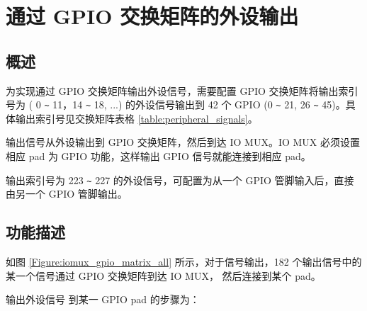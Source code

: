 \documentclass[main\_\_CN.tex]{subfiles}
\begin{document}
\section{通过 GPIO 交换矩阵的外设输出}

\subsection{概述}

为实现通过 GPIO 交换矩阵输出外设信号，需要配置 GPIO 交换矩阵将输出索引号为 ( 0 \verb+~+ 11，14 \verb+~+ 18, ...) 的外设信号输出到 42 个 GPIO (0 \verb+~+ 21, 26 \verb+~+ 45)。具体输出索引号见交换矩阵表格 \ref{table:peripheral_signals}。

输出信号从外设输出到 GPIO 交换矩阵，然后到达 IO MUX。IO MUX 必须设置相应 pad 为 GPIO 功能，这样输出 GPIO 信号就能连接到相应 pad。


\begin{tiplisting}
输出索引号为 223 \verb+~+ 227 的外设信号，可配置为从一个 GPIO 管脚输入后，直接由另一个 GPIO 管脚输出。
\end{tiplisting}
\vspace{-2em}
\subsection{功能描述}\label{IOMUXPeripheralOutput}

如图 \ref{Figure:iomux_gpio_matrix_all} 所示，对于信号输出，182 个输出信号中的某一个信号通过 GPIO 交换矩阵到达 IO MUX， 然后连接到某个 pad。

输出外设信号  到某一 GPIO pad  的步骤为：
\end{document}
